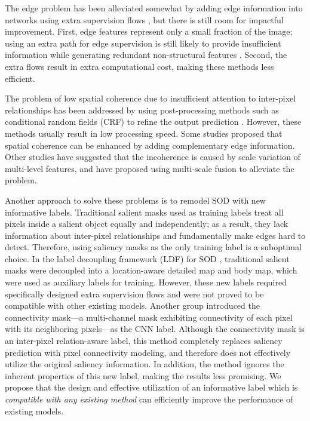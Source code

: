 \documentclass[final]{cvpr}
\begin{document}
The edge problem has been alleviated somewhat by adding edge information into networks using extra supervision flows \cite{egnet,scrn,ITSD}, but there is still room for impactful improvement. First, edge features represent only a small fraction of the image; using an extra path for edge supervision is still likely to provide insufficient information while generating redundant non-structural features \cite{MINet}. Second, the extra flows result in extra computational cost, making these methods less efficient.

The problem of low spatial coherence due to insufficient attention to inter-pixel relationships has been addressed by using post-processing methods such as conditional random fields (CRF) to refine the output prediction \cite{DSS,picanet,crf2}. However, these methods usually result in low processing speed. Some studies \cite{egnet,non-local} proposed that spatial coherence can be enhanced by adding complementary edge information. Other studies \cite{MINet,f3net} have suggested that the incoherence is caused by scale variation of multi-level features, and have proposed using multi-scale fusion to alleviate the problem.

Another approach to solve these problems is to remodel SOD with new informative labels. Traditional salient masks used as training labels treat all pixels inside a salient object equally and independently; as a result, they lack information about inter-pixel relationships and fundamentally make edges hard to detect. Therefore, using saliency masks as the only training label is a suboptimal choice. In the label decoupling framework (LDF) for SOD \cite{LDF}, traditional salient masks were decoupled into a location-aware detailed map and body map, which were used as auxiliary labels for training. However, these new labels required specifically designed extra supervision flows and were not proved to be compatible with other existing models. Another group \cite{ConnNet} introduced the connectivity mask—a multi-channel mask exhibiting connectivity of each pixel with its neighboring pixels—as the CNN label. Although the connectivity mask is an inter-pixel relation-aware label, this method completely replaces saliency prediction with pixel connectivity modeling, and therefore does not effectively utilize the original saliency information. In addition, the method ignores the inherent properties of this new label, making the results less promising. We propose that the design and effective utilization of an informative label which is \textit{compatible with any existing method} can efficiently improve the performance of existing models.
\end{document}
